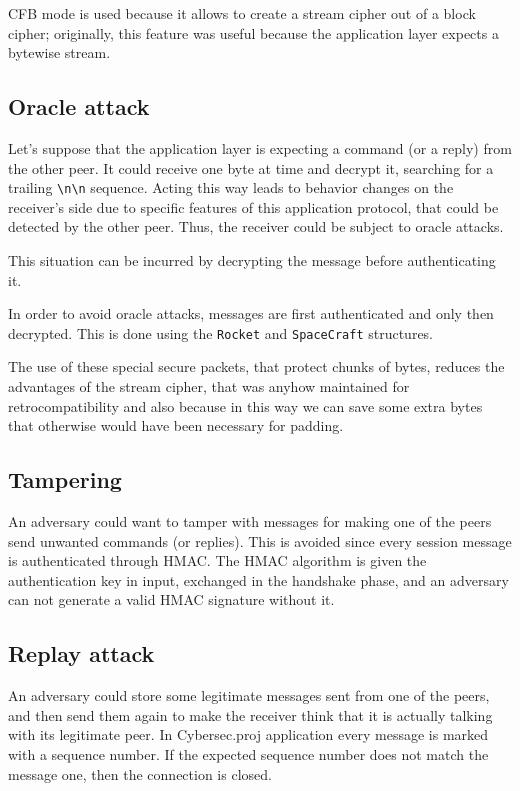 \documentclass[a4paper,12pt]{article}
\newcommand{\projectname}{Cybersec.proj}
\begin{document}
CFB mode is used because it allows to create a stream cipher out of a block cipher;
originally, this feature was useful because the application layer expects a bytewise stream.

\subsection{Oracle attack}
Let's suppose that the application layer is expecting a command (or a reply) from the other peer.
It could receive one byte at time and decrypt it, searching for a trailing \verb+\n\n+ sequence.
Acting this way leads to behavior changes on the receiver's side due to specific features of this application protocol, that could be detected by the other peer.
Thus, the receiver could be subject to oracle attacks.

This situation can be incurred by decrypting the message before authenticating it.

In order to avoid oracle attacks, messages are first authenticated and only then decrypted.
This is done using the \texttt{Rocket} and \texttt{SpaceCraft} structures.

The use of these special secure packets, that protect chunks of bytes, reduces the advantages of the stream cipher, that was anyhow maintained for retrocompatibility and also because in this way we can save some extra bytes that otherwise would have been necessary for padding.

\subsection{Tampering}
An adversary could want to tamper with messages for making one of the peers send unwanted commands (or replies).
This is avoided since every session message is authenticated through HMAC.
The HMAC algorithm is given the authentication key in input, exchanged in the handshake phase, and an adversary can not generate a valid HMAC signature without it.

\subsection{Replay attack}
An adversary could store some legitimate messages sent from one of the peers, and then send them again to make the receiver think that it is actually talking with its legitimate peer.
In \projectname{} application every message is marked with a sequence number.
If the expected sequence number does not match the message one, then the connection is closed.
\end{document}
